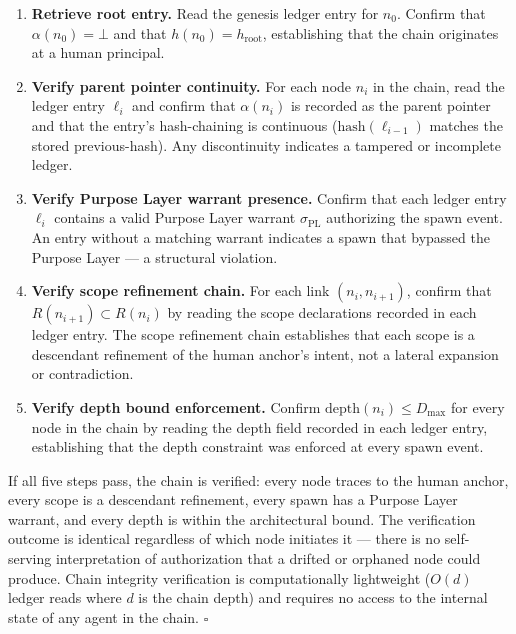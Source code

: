 \begin{enumerate}
    \item[(V1)]\textbf{Retrieve root entry.} Read the genesis ledger entry for $n_0$. Confirm that $\alpha(n_0) = \bot$ and that $h(n_0) = h_{\text{root}}$, establishing that the chain originates at a human principal.

    \item[(V2)]\textbf{Verify parent pointer continuity.} For each node $n_i$ in the chain, read the ledger entry $\ell_i$ and confirm that $\alpha(n_i)$ is recorded as the parent pointer and that the entry's hash-chaining is continuous ($\text{hash}(\ell_{i-1})$ matches the stored previous-hash). Any discontinuity indicates a tampered or incomplete ledger.

    \item[(V3)]\textbf{Verify Purpose Layer warrant presence.} Confirm that each ledger entry $\ell_i$ contains a valid Purpose Layer warrant $\sigma_{\text{PL}}$ authorizing the spawn event. An entry without a matching warrant indicates a spawn that bypassed the Purpose Layer — a structural violation.

    \item[(V4)]\textbf{Verify scope refinement chain.} For each link $(n_i, n_{i+1})$, confirm that $R(n_{i+1}) \subset R(n_i)$ by reading the scope declarations recorded in each ledger entry. The scope refinement chain establishes that each scope is a descendant refinement of the human anchor's intent, not a lateral expansion or contradiction.

    \item[(V5)]\textbf{Verify depth bound enforcement.} Confirm $\text{depth}(n_i) \leq D_{\max}$ for every node in the chain by reading the depth field recorded in each ledger entry, establishing that the depth constraint was enforced at every spawn event.
\end{enumerate}

If all five steps pass, the chain is verified: every node traces to the human anchor, every scope is a descendant refinement, every spawn has a Purpose Layer warrant, and every depth is within the architectural bound. The verification outcome is identical regardless of which node initiates it — there is no self-serving interpretation of authorization that a drifted or orphaned node could produce. Chain integrity verification is computationally lightweight ($O(d)$ ledger reads where $d$ is the chain depth) and requires no access to the internal state of any agent in the chain. $\square$

